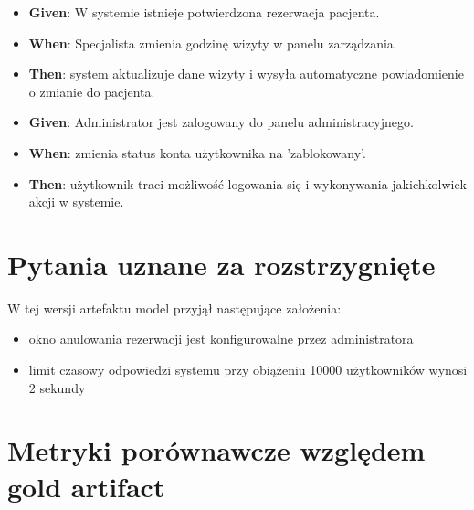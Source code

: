 \documentclass[12pt,a4paper]{article}
\begin{document}
\begin{description}[leftmargin=1.5cm, labelwidth=1cm, labelsep=0.5cm]
\item[\textbf{AC5 -- }] 
\begin{itemize}[itemsep=2pt]
    \item \textbf{Given}: W systemie istnieje potwierdzona rezerwacja pacjenta.
    \item \textbf{When}: Specjalista zmienia godzinę wizyty w panelu zarządzania. 
    \item \textbf{Then}: system aktualizuje dane wizyty i wysyła automatyczne powiadomienie o zmianie do pacjenta.
\end{itemize}

\item[\textbf{AC6 -- }] 
\begin{itemize}[itemsep=2pt]
    \item \textbf{Given}: Administrator jest zalogowany do panelu administracyjnego.
    \item \textbf{When}: zmienia status konta użytkownika na 'zablokowany'.
    \item \textbf{Then}: użytkownik traci możliwość logowania się i wykonywania jakichkolwiek akcji w systemie.
\end{itemize}

\vspace{0.5cm}

\end{description}


\section{Pytania uznane za rozstrzygnięte}

W tej wersji artefaktu model przyjął następujące założenia:

\begin{itemize}[leftmargin=1.5em]
  \item okno anulowania rezerwacji jest konfigurowalne przez administratora
  \item limit czasowy odpowiedzi systemu przy obiążeniu 10000 użytkowników wynosi 2 sekundy 
\end{itemize}

\newpage

\section{Metryki porównawcze względem gold artifact}
\end{document}
